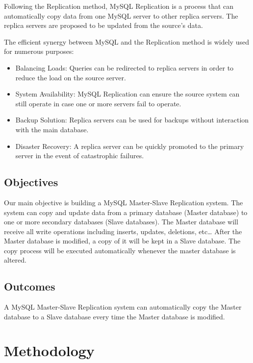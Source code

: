\documentclass[a4paper,12pt]{report}
\begin{document}
\hspace*{1em}Following the Replication method, MySQL Replication is a process that can automatically copy data from one MySQL server to other replica servers. The replica servers are proposed to be updated from the source’s data. 

\hspace*{1em}The efficient synergy between MySQL and the Replication method is widely used for numerous purposes:
\begin{itemize}
    \item Balancing Loads: Queries can be redirected to replica servers in order to reduce the load on the source server.
    \item System Availability: MySQL Replication can ensure the source system can still operate in case one or more servers fail to operate.
    \item Backup Solution: Replica servers can be used for backups without interaction with the main database.
    \item Disaster Recovery: A replica server can be quickly promoted to the primary server in the event of catastrophic failures.
\end{itemize}

\subsection{Objectives}
\hspace*{1em}Our main objective is building a MySQL Master-Slave Replication system. The system can copy and update data from a primary database (Master database) to one or more secondary databases (Slave databases). The Master database will receive all write operations including inserts, updates, deletions, etc… After the Master database is modified, a copy of it will be kept in a Slave database. The copy process will be executed automatically whenever the master database is altered.

\subsection{Outcomes}
\hspace*{1em}A MySQL Master-Slave Replication system can automatically copy the Master database to a Slave database every time the Master database is modified.

\section{\bfseries Methodology}
\fontsize{13}{16}\selectfont
\end{document}
